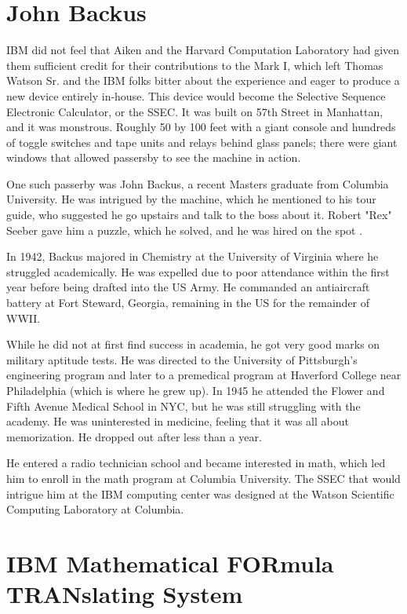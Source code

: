 \section{John Backus}

IBM did not feel that Aiken and the Harvard Computation Laboratory had given
them sufficient credit for their contributions to the Mark I, which left
Thomas Watson Sr. and the IBM folks bitter about the experience and eager to
produce a new device entirely in-house. This device would become the Selective
Sequence Electronic Calculator, or the SSEC. It was built on 57th Street in
Manhattan, and it was monstrous. Roughly 50 by 100 feet with a giant console
and hundreds of toggle switches and tape units and relays behind glass panels;
there were giant windows that allowed passersby to see the machine in action.

One such passerby was John Backus, a recent Masters graduate from Columbia
University. He was intrigued by the machine, which he mentioned to his tour
guide, who suggested he go upstairs and talk to the boss about it. Robert "Rex"
Seeber gave him a puzzle, which he solved, and he was hired on the spot
\cite{backus_oral_history_2006}.

In 1942, Backus majored in Chemistry at the University of Virginia where he
struggled academically. He was expelled due to poor attendance within the first
year before being drafted into the US Army. He commanded an antiaircraft
battery at Fort Steward, Georgia, remaining in the US for the remainder of
WWII.

While he did not at first find success in academia, he got very good marks on
military aptitude tests. He was directed to the University of Pittsburgh's
engineering program and later to a premedical program at Haverford College near
Philadelphia (which is where he grew up). In 1945 he attended the Flower and
Fifth Avenue Medical School in NYC, but he was still struggling with the
academy. He was uninterested in medicine, feeling that it was all about
memorization. He dropped out after less than a year.

He entered a radio technician school and became interested in math, which led
him to enroll in the math program at Columbia University. The SSEC that would
intrigue him at the IBM computing center was designed at the Watson Scientific
Computing Laboratory at Columbia.

\section{IBM Mathematical FORmula TRANslating System}

